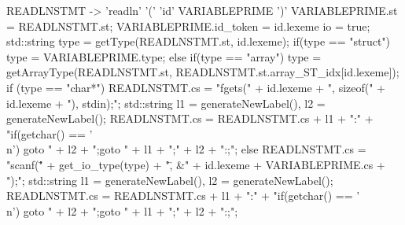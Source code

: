 \begin{verbbox}[\scriptsize]
READLNSTMT -> 'readln' '(' 'id' VARIABLEPRIME ')'
{
VARIABLEPRIME.st = READLNSTMT.st;
VARIABLEPRIME.id_token = id.lexeme 
io = true;
std::string type = getType(READLNSTMT.st, id.lexeme);
if(type == "struct") {
    type = VARIABLEPRIME.type;
} else if(type == "array") {
    type = getArrayType(READLNSTMT.st, READLNSTMT.st.array_ST_idx[id.lexeme]);
}
if (type == "char*") {
    READLNSTMT.cs = "fgets(" + id.lexeme + ", sizeof(" + id.lexeme + "), stdin);\n";
    std::string l1 = generateNewLabel(), l2 = generateNewLabel();
    READLNSTMT.cs = READLNSTMT.cs + l1 + ":\n" + "if(getchar() == '\\n') goto " + l2 + ";\n goto " +
        l1 + ";\n" + l2 + ":;\n";
} else {
    READLNSTMT.cs = "scanf(\"" + get_io_type(type) + "\", &" + id.lexeme + VARIABLEPRIME.cs + ");\n";
    std::string l1 = generateNewLabel(), l2 = generateNewLabel();
    READLNSTMT.cs = READLNSTMT.cs + l1 + ":\n" + "if(getchar() == '\\n') goto " + l2 + ";\n goto " +
        l1 + ";\n" + l2 + ":;\n";
}
}
\end{verbbox}
\theverbbox\\